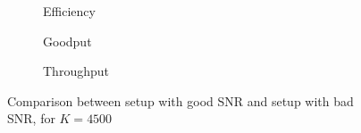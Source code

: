 \begin{figure}[t]
\centering
\begin{subfigure}{0.23\textwidth}
	\captionsetup{justification=centering,font=scriptsize}
	\centering
	\setlength\fwidth{\textwidth}
	\setlength{}
	
	\caption{Efficiency}
	\label{fig:wifi_eff_lsnr_4500}
\end{subfigure}\hspace{2em}%
\begin{subfigure}{0.23\textwidth}
	\captionsetup{justification=centering,font=scriptsize}
	\centering
	\setlength\fwidth{\textwidth}
	\setlength{}
	
	\caption{Goodput}
	\label{fig:wifi_good_lsnr_4500}
\end{subfigure}\hspace{2em}%
\begin{subfigure}{0.23\textwidth}
	\captionsetup{justification=centering,font=scriptsize}
	\centering
	\setlength\fwidth{\textwidth}
	\setlength{}
	
	\caption{Throughput}
	\label{fig:wifi_thr_lsnr_4500}
\end{subfigure}
\caption{Comparison between setup with good SNR and setup with bad SNR, for $K=4500$}
\label{fig:wifi_lsnr_4500}
\end{figure}


